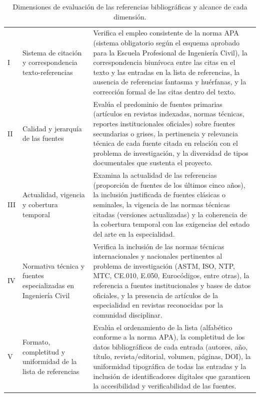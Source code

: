\vspace{-10pt}
\begin{table}[htbp]
\centering
\scriptsize
\caption{Dimensiones de evaluación de las referencias bibliográficas y alcance de cada dimensión.}
\label{tab:dim-referencias}
\begin{tabularx}{\textwidth}{|C{0.8cm}|L{2.5cm}|X|}
\hline
{}
 &  &  \\ \hline
I & Sistema de citación y correspondencia texto-referencias & Verifica el empleo consistente de la norma APA (sistema obligatorio según el esquema aprobado para la Escuela Profesional de Ingeniería Civil), la correspondencia biunívoca entre las citas en el texto y las entradas en la lista de referencias, la ausencia de referencias fantasma y huérfanas, y la corrección formal de las citas dentro del texto. \\ \hline
{}
II & Calidad y jerarquía de las fuentes & Evalúa el predominio de fuentes primarias (artículos en revistas indexadas, normas técnicas, reportes institucionales oficiales) sobre fuentes secundarias o grises, la pertinencia y relevancia técnica de cada fuente citada en relación con el problema de investigación, y la diversidad de tipos documentales que sustenta el proyecto. \\ \hline
III & Actualidad, vigencia y cobertura temporal & Examina la actualidad de las referencias (proporción de fuentes de los últimos cinco años), la inclusión justificada de fuentes clásicas o seminales, la vigencia de las normas técnicas citadas (versiones actualizadas) y la coherencia de la cobertura temporal con las exigencias del estado del arte en la especialidad. \\ \hline
{}
IV & Normativa técnica y fuentes especializadas en Ingeniería Civil & Verifica la inclusión de las normas técnicas internacionales y nacionales pertinentes al problema de investigación (ASTM, ISO, NTP, MTC, CE.010, E.050, Eurocódigos, entre otras), la referencia a fuentes institucionales y bases de datos oficiales, y la presencia de artículos de la especialidad en revistas reconocidas por la comunidad disciplinar. \\ \hline
V & Formato, completitud y uniformidad de la lista de referencias & Evalúa el ordenamiento de la lista (alfabético conforme a la norma APA), la completitud de los datos bibliográficos de cada entrada (autores, año, título, revista/editorial, volumen, páginas, DOI), la uniformidad tipográfica de todas las entradas y la inclusión de identificadores digitales que garanticen la accesibilidad y verificabilidad de las fuentes. \\ \hline
\end{tabularx}
\end{table}


